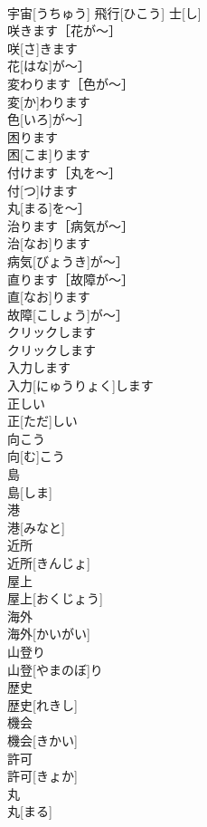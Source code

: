 \documentclass[8pt]{extreport}
\begin{document}
\begin{CJK}{UTF8}{min}
\\	宇宙[うちゅう] 飛行[ひこう] 士[し]	
\\	咲きます［花が〜］	
\\	咲[さ]きます
\\	花[はな]が〜］	
\\	変わります［色が〜］	
\\	変[か]わります
\\	色[いろ]が〜］	
\\	困ります	
\\	困[こま]ります	
\\	付けます［丸を〜］	
\\	付[つ]けます
\\	丸[まる]を〜］	
\\	治ります［病気が〜］	
\\	治[なお]ります
\\	病気[びょうき]が〜］	
\\	直ります［故障が〜］	
\\	直[なお]ります
\\	故障[こしょう]が〜］	
\\	クリックします	
\\	クリックします	
\\	入力します	
\\	入力[にゅうりょく]します	
\\	正しい	
\\	正[ただ]しい	
\\	向こう	
\\	向[む]こう	
\\	島	
\\	島[しま]	
\\	港	
\\	港[みなと]	
\\	近所	
\\	近所[きんじょ]	
\\	屋上	
\\	屋上[おくじょう]	
\\	海外	
\\	海外[かいがい]	
\\	山登り	
\\	山登[やまのぼ]り	
\\	歴史	
\\	歴史[れきし]	
\\	機会	
\\	機会[きかい]	
\\	許可	
\\	許可[きょか]	
\\	丸	
\\	丸[まる]	

\end{CJK}
\end{document}
